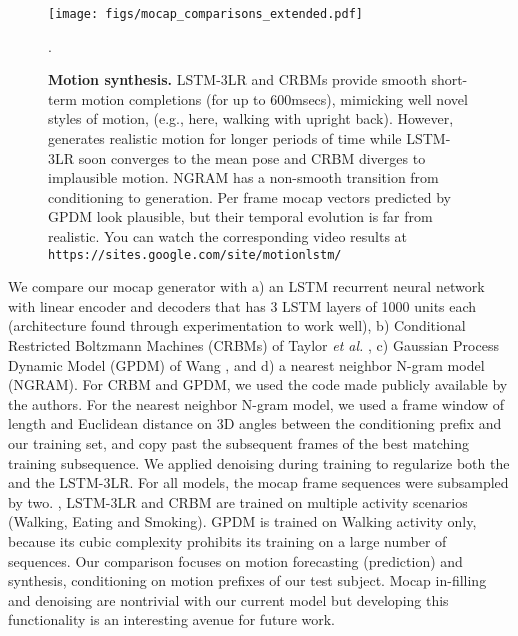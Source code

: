 \documentclass[10pt,twocolumn,letterpaper]{article}
\begin{document}
\begin{figure}[h!]
\begin{center}
\texttt{[image: figs/mocap\_comparisons\_extended.pdf]}
\end{center}
\caption{ \textbf{Motion synthesis.}  
LSTM-3LR and  CRBMs \cite{thr-mhmub-06} provide  smooth short-term motion completions  (for up to 600msecs), mimicking well novel styles of motion, (e.g., here, walking with upright back).  However,    generates realistic motion for  longer periods of time while LSTM-3LR soon converges to the mean pose and  CRBM  diverges to implausible motion.  NGRAM  has a non-smooth transition from conditioning to generation. Per frame mocap vectors  predicted by GPDM \cite{Wang06gaussianprocess}  look plausible,  but their temporal evolution is far from realistic.  You can watch the corresponding video results  at {\tt https://sites.google.com/site/motionlstm/} }.
\label{fig:crbm}
\end{figure}

We compare our  mocap generator with  a) an LSTM recurrent neural network with linear encoder and decoders that has 3 LSTM layers of 1000 units each (architecture found through experimentation to work well), b) Conditional Restricted Boltzmann Machines (CRBMs) of Taylor \textit{et al.} \cite{thr-mhmub-06}, c)  Gaussian Process Dynamic Model (GPDM) of Wang \ea \cite{Wang06gaussianprocess}, and d) a nearest neighbor N-gram model (NGRAM).   For CRBM and GPDM, we used the code made publicly available by the authors. For the nearest neighbor N-gram model, we used a frame window of length  and Euclidean distance on 3D angles between the conditioning prefix and our training set,  and copy past the subsequent frames of the best matching training subsequence.  
We applied denoising during training to regularize both the  and the LSTM-3LR.  For all models, the mocap frame sequences were subsampled by two. , LSTM-3LR and CRBM are trained on multiple activity scenarios (Walking, Eating and Smoking).  GPDM is trained on Walking activity only, because   its  cubic complexity prohibits its training on a large number of  sequences.  
Our comparison focuses  on motion forecasting (prediction) and synthesis, conditioning on motion prefixes of our test subject.  Mocap in-filling and denoising  are nontrivial with our current  model but developing this functionality is an interesting avenue for future work. 
\end{document}
